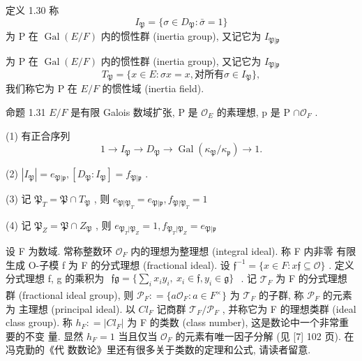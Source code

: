 \documentclass[]{article}
\begin{document}
{定义 1.30 称 $$
I _ {\mathfrak {P}} = \{\sigma \in D _ {\mathfrak {P}}: \bar {\sigma} = 1 \}
$$为 P 在 $\operatorname { G a l } ( E / F )$ 内的惯性群 (inertia group), 又记它为 $I _ { \mathfrak { P } | { \mathfrak { p } } }$ 

为 P 在 $\operatorname { G a l } ( E / F )$ 内的惯性群 (inertia group), 又记它为 $I _ { \mathfrak { P } | { \mathfrak { p } } }$ $$
T _ {\mathfrak {P}} = \{x \in E: \sigma x = x, \text {对所有} \sigma \in I _ {\mathfrak {P}} \},
$$我们称它为 P 在 $E / F$ 的惯性域 (inertia field). 

命题 1.31 $E / F$ 是有限 Galois 数域扩张, P 是 $\mathcal { O } _ { E }$ 的素理想, p 是 P $\cap { \mathcal { O } } _ { F }$ . 

(1) 有正合序列 $$
1 \to I _ {\mathfrak {P}} \to D _ {\mathfrak {P}} \to \operatorname{Gal} (\kappa_ {\mathfrak {P}} / \kappa_ {\mathfrak {p}}) \to 1.
$$

(2) $| I _ { \mathfrak { P } } | = e _ { \mathfrak { P } | \mathfrak { p } } , [ D _ { \mathfrak { P } } : I _ { \mathfrak { P } } ] = f _ { \mathfrak { P } | \mathfrak { p } }$ . 

(3) 记 $\mathfrak { P } _ { T } = \mathfrak { P } \cap T _ { \mathfrak { P } }$ , 则 $e _ { \mathfrak { P } | \mathfrak { P } _ { T } } = e _ { \mathfrak { P } | \mathfrak { p } } , f _ { \mathfrak { P } | \mathfrak { P } _ { T } } = 1$ 

(4) 记 $\mathfrak { P } _ { Z } = \mathfrak { P } \cap Z _ { \mathfrak { P } }$ , 则 $e _ { \mathfrak { P } _ { T } | \mathfrak { P } _ { Z } } = 1 , f _ { \mathfrak { P } _ { T } | \mathfrak { P } _ { Z } } = e _ { \mathfrak { P } | { \mathfrak { p } } }$ 

设 F 为数域. 常称整数环 ${ \mathcal { O } } _ { F }$ 内的理想为整理想 (integral ideal). 称 F 内非零 有限生成 O-子模 f 为 F 的分式理想 (fractional ideal). 设 $\mathfrak { f } ^ { - 1 } = \{ x \in F : x \mathfrak { f } \subseteq \mathcal { O } \}$ . 定义分式理想 f, g 的乘积为 $\begin{array} { r } { \mathfrak { f g } = \{ \sum _ { i } x _ { i } y _ { i } , \ x _ { i } \in \mathfrak { f } , y _ { i } \in \mathfrak { g } \} } \end{array}$ . 记 $\mathcal { T } _ { F }$ 为 F 的分式理想 群 (fractional ideal group), 则 $\mathcal { P } _ { F } : = \{ a \mathcal { O } _ { F } : a \in F ^ { \times } \}$ 为 $\mathcal { T } _ { F }$ 的子群, 称 $\mathcal { P } _ { F }$ 的元素为 主理想 (principal ideal). 以 $C l _ { F }$ 记商群 $\mathcal { T } _ { F } / \mathcal { P } _ { F }$ , 并称它为 F 的理想类群 (ideal class group). 称 $h _ { F } : = | C l _ { F } |$ 为 F 的类数 (class number), 这是数论中一个非常重要的不变 量. 显然 $h _ { F } = 1$ 当且仅当 ${ \mathcal { O } } _ { F }$ 的元素有唯一因子分解 (见 [7] 102 页). 在冯克勤的《代 数数论》里还有很多关于类数的定理和公式, 请读者留意. 

}
\end{document}
